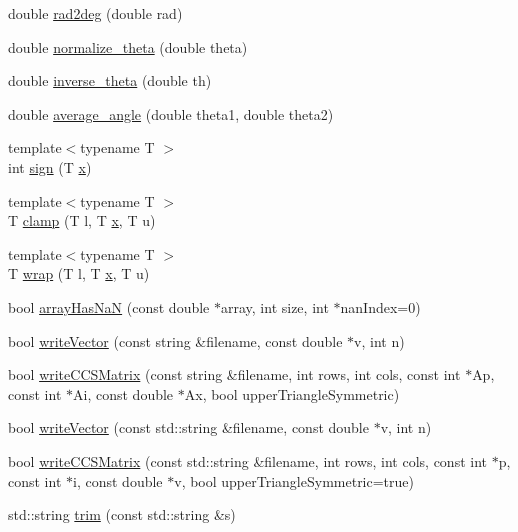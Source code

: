 \begin{DoxyCompactItemize}
\item 
double \hyperlink{namespaceg2o_a3965702cbb6051fa2bdb0c75c0358126}{rad2deg} (double rad)
\item 
double \hyperlink{namespaceg2o_a9f036eb4c147ddf174aa56fa031f3867}{normalize\+\_\+theta} (double theta)
\item 
double \hyperlink{namespaceg2o_a9ae48fc8caba4b009642ca53d69a3b98}{inverse\+\_\+theta} (double th)
\item 
double \hyperlink{namespaceg2o_a25f6d3c7415a89f7a5bc1875a7fa5009}{average\+\_\+angle} (double theta1, double theta2)
\item 
{\footnotesize template$<$typename T $>$ }\\int \hyperlink{namespaceg2o_a821ae3df8a97b37daf8804ef3a26ef1d}{sign} (T \hyperlink{sparse__helper_8cpp_af88b946fb90d5f08b5fb740c70e98c10}{x})
\item 
{\footnotesize template$<$typename T $>$ }\\T \hyperlink{namespaceg2o_a50939862674314724dd800c41f82e7fe}{clamp} (T l, T \hyperlink{sparse__helper_8cpp_af88b946fb90d5f08b5fb740c70e98c10}{x}, T u)
\item 
{\footnotesize template$<$typename T $>$ }\\T \hyperlink{namespaceg2o_a207912b4849eaff934f6384bc79d07ce}{wrap} (T l, T \hyperlink{sparse__helper_8cpp_af88b946fb90d5f08b5fb740c70e98c10}{x}, T u)
\item 
bool \hyperlink{namespaceg2o_a123840a60e0d1dde58088d15a1e1fffa}{array\+Has\+NaN} (const double $\ast$array, int size, int $\ast$nan\+Index=0)
\item 
bool \hyperlink{namespaceg2o_abff05374a27e1736c5f17e2c7fb0d8ff}{write\+Vector} (const string \&filename, const double $\ast$v, int n)
\item 
bool \hyperlink{namespaceg2o_a40901721245dfa679e304f0231acb0f6}{write\+C\+C\+S\+Matrix} (const string \&filename, int rows, int cols, const int $\ast$Ap, const int $\ast$Ai, const double $\ast$Ax, bool upper\+Triangle\+Symmetric)
\item 
bool \hyperlink{namespaceg2o_af915a01ed81a358c0de55bd0dc2262ba}{write\+Vector} (const std\+::string \&filename, const double $\ast$v, int n)
\item 
bool \hyperlink{namespaceg2o_aa2c5876c446de3e17c90047956eabc78}{write\+C\+C\+S\+Matrix} (const std\+::string \&filename, int rows, int cols, const int $\ast$p, const int $\ast$i, const double $\ast$v, bool upper\+Triangle\+Symmetric=true)
\item 
std\+::string \hyperlink{group__utils_ga5c3812993227cfbec772c7477928c1fc}{trim} (const std\+::string \&s)

\end{DoxyCompactItemize}
